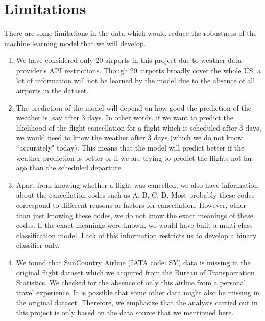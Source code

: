 \documentclass[12pt]{article}
\begin{document}
\section{Limitations}
\label{sec:limit}
There are some limitations in the data which would reduce the robustness of the machine learning model that we will develop.
\begin{enumerate}
\itemsep0em
\item We have considered only 20 airports in this project due to weather data provider's API restrictions. Though 20 airports broadly cover the whole US, a lot of information will not be learned by the model due to the absence of all airports in the dataset. 
\item The prediction of the model will depend on how good the prediction of the weather is, say after 3 days. In other words. if we want to predict the likelihood of the flight cancellation for a flight which is scheduled after 3 days, we would need to know the weather after 3 days (which we do not know ``accurately" today). This means that the model will predict better if the weather prediction is better or if we are trying to predict the flights not far ago than the scheduled departure.
\item Apart from knowing whether a flight was cancelled, we also have information about the cancellation codes such as A, B, C, D. Most probably these codes correspond to different reasons or factors for cancellation. However, other than just knowing these codes, we do not know the exact meanings of these codes. If the exact meanings were known, we would have built a multi-class classification model. Lack of this information restricts us to develop a binary classifier only.  
\item We found that SunCountry Airline (IATA code: SY) data is missing in the original flight dataset which we acquired from the \href{https://www.transtats.bts.gov/DL_SelectFields.asp?Table_ID=236&DB_Short_Name=On-Time}{Bureau of Transportation Statistics}. We checked for the absence of only this airline from a personal travel experience. It is possible that some other data might also be missing in the original dataset. Therefore, we emphasize that the analysis carried out in this project is only based on the data source that we mentioned here. 
\end{enumerate}
\end{document}
